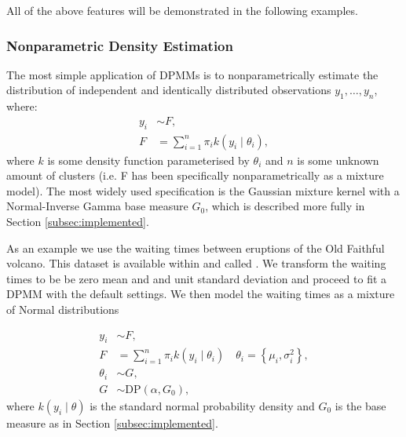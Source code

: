 \documentclass[nojss]{jss}
\begin{document}
All of the above features will be demonstrated in the following examples.

\subsubsection{Nonparametric Density Estimation}
The most simple application of DPMMs is to  nonparametrically estimate the distribution of independent and identically distributed observations $y_1,\ldots,y_n$, where:
\begin{align*}
y_i & \sim F ,\\
F & = \sum _{i=1} ^n \pi _i k(y_i \mid \theta _i),
\end{align*}
where $k$ is some density function parameterised by $\theta _i$ and $n$ is some unknown amount of clusters (i.e. F has been specifically nonparametrically as a mixture model). The most widely used specification is the Gaussian mixture kernel with a Normal-Inverse Gamma base measure $G_0$, which is described more fully in Section \ref{subsec:implemented}.

As an example we use the waiting times between eruptions of the Old Faithful volcano. This dataset is available within  and called . We transform the waiting times to be be zero mean and and unit standard deviation and proceed to fit a DPMM with the default settings. We then model the waiting times as a mixture of Normal distributions

\begin{align*}
y_i & \sim F, \\
F & = \sum _{i=1} ^n \pi _i k(y_i \mid \theta _i) \quad \theta _i = \left\lbrace \mu _i , \sigma ^2 _i \right\rbrace , \\
\theta _i & \sim G, \\
G & \sim \text{DP}(\alpha , G_0),
\end{align*}
where $k(y _i \mid \theta )$ is the standard normal probability density and $G_0$ is the base measure as in Section \ref{subsec:implemented}.
\newpage %
\begin{Schunk}
\end{Schunk}
\end{document}
